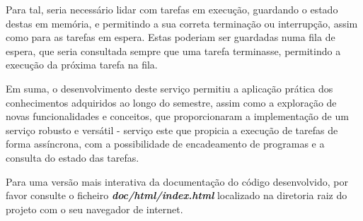 \documentclass[a4paper,11pt]{scrreprt}
\begin{document}
    Para tal, seria necessário lidar com tarefas em execução, guardando
    o estado destas em memória, e permitindo a sua correta terminação
    ou interrupção, assim como para as tarefas em espera. Estas poderiam
    ser guardadas numa fila de espera, que seria consultada sempre que
    uma tarefa terminasse, permitindo a execução da próxima tarefa na
    fila.

    Em suma, o desenvolvimento deste serviço permitiu a aplicação prática
    dos conhecimentos adquiridos ao longo do semestre, assim como a
    exploração de novas funcionalidades e conceitos, que proporcionaram
    a implementação de um serviço robusto e versátil - serviço este que 
    propicia a execução de tarefas de forma assíncrona, com a possibilidade de
    encadeamento de programas e a consulta do estado das tarefas.


%


    \quad Para uma versão mais interativa da documentação do código desenvolvido, por favor consulte o
    ficheiro \textbf{\textit{doc/html/index.html}} localizado na diretoria raiz do projeto com o seu
    navegador de internet.


\end{document}
